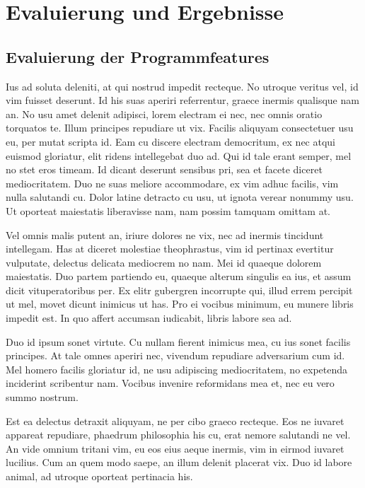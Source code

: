 \chapter{Evaluierung und Ergebnisse}
\label{evaluierung_und_erbenisse}

\section{Evaluierung der Programmfeatures}
\label{evaluierung_der_programmfeatures}

Ius ad soluta deleniti, at qui nostrud impedit recteque. No utroque veritus vel, id vim fuisset deserunt. Id his suas aperiri referrentur, graece inermis qualisque nam an. No usu amet delenit adipisci, lorem electram ei nec, nec omnis oratio torquatos te. Illum principes repudiare ut vix. Facilis aliquyam consectetuer usu eu, per mutat scripta id. Eam cu discere electram democritum, ex nec atqui euismod gloriatur, elit ridens intellegebat duo ad. Qui id tale erant semper, mel no stet eros timeam. Id dicant deserunt sensibus pri, sea et facete diceret mediocritatem. Duo ne suas meliore accommodare, ex vim adhuc facilis, vim nulla salutandi cu. Dolor latine detracto cu usu, ut ignota verear nonummy usu. Ut oporteat maiestatis liberavisse nam, nam possim tamquam omittam at.

Vel omnis malis putent an, iriure dolores ne vix, nec ad inermis tincidunt intellegam. Has at diceret molestiae theophrastus, vim id pertinax evertitur vulputate, delectus delicata mediocrem no nam. Mei id quaeque dolorem maiestatis. Duo partem partiendo eu, quaeque alterum singulis ea ius, et assum dicit vituperatoribus per. Ex elitr gubergren incorrupte qui, illud errem percipit ut mel, movet dicunt inimicus ut has. Pro ei vocibus minimum, eu munere libris impedit est. In quo affert accumsan iudicabit, libris labore sea ad.

Duo id ipsum sonet virtute. Cu nullam fierent inimicus mea, cu ius sonet facilis principes. At tale omnes aperiri nec, vivendum repudiare adversarium cum id. Mel homero facilis gloriatur id, ne usu adipiscing mediocritatem, no expetenda inciderint scribentur nam. Vocibus invenire reformidans mea et, nec eu vero summo nostrum.

Est ea delectus detraxit aliquyam, ne per cibo graeco recteque. Eos ne iuvaret appareat repudiare, phaedrum philosophia his cu, erat nemore salutandi ne vel. An vide omnium tritani vim, eu eos eius aeque inermis, vim in eirmod iuvaret lucilius. Cum an quem modo saepe, an illum delenit placerat vix. Duo id labore animal, ad utroque oporteat pertinacia his.

